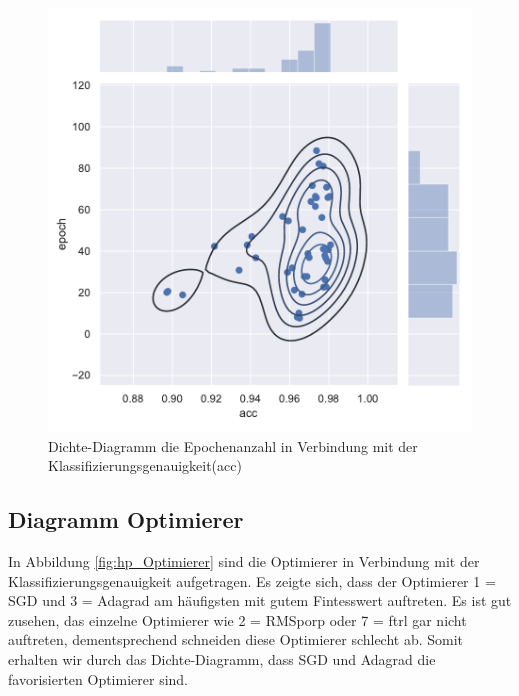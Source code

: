 \begin{figure}[H]
  \centering  
  \includegraphics[scale=0.9]{img/hp_epoch.pdf}
  \caption{Dichte-Diagramm die Epochenanzahl in Verbindung mit der Klassifizierungsgenauigkeit(acc)}
  \label{fig:hp_Epochen}
\end{figure}

\newpage

\subsection{Diagramm Optimierer}
In Abbildung \ref{fig:hp_Optimierer} sind die Optimierer in Verbindung mit der Klassifizierungsgenauigkeit aufgetragen. Es zeigte sich, dass der Optimierer 1 = SGD und 3 = Adagrad am häufigsten mit gutem Fintesswert auftreten. Es ist gut zusehen, das einzelne Optimierer wie 2 = RMSporp oder 7 = ftrl gar nicht auftreten, dementsprechend schneiden diese Optimierer schlecht ab. Somit erhalten wir durch das Dichte-Diagramm, dass SGD und Adagrad die favorisierten Optimierer sind.


